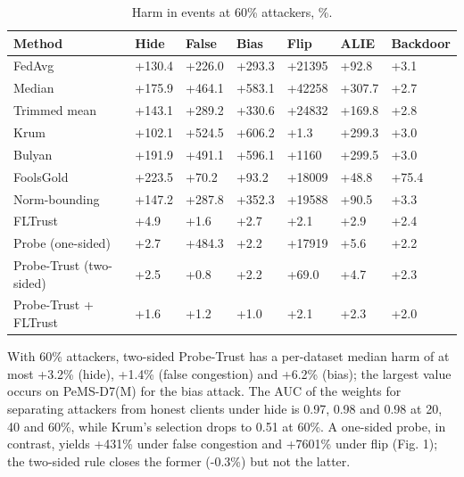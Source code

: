 \documentclass[journal]{IEEEtran}
\begin{document}
\begin{table}[!t]
\caption{Harm in events at 60\% attackers, \%.}
\centering
\footnotesize
\renewcommand{\arraystretch}{1.12}
\begin{tabular}{|>{\raggedright\arraybackslash}p{4.15cm}|>{\raggedright\arraybackslash}p{1.75cm}|>{\raggedright\arraybackslash}p{1.75cm}|>{\raggedright\arraybackslash}p{1.75cm}|>{\raggedright\arraybackslash}p{1.75cm}|>{\raggedright\arraybackslash}p{1.75cm}|>{\raggedright\arraybackslash}p{1.75cm}|}
\hline
\textbf{Method} & \textbf{Hide} & \textbf{False} & \textbf{Bias} & \textbf{Flip} & \textbf{ALIE} & \textbf{Backdoor} \\
\hline
FedAvg & +130.4 & +226.0 & +293.3 & +21395 & +92.8 & +3.1 \\
\hline
Median & +175.9 & +464.1 & +583.1 & +42258 & +307.7 & +2.7 \\
\hline
Trimmed mean & +143.1 & +289.2 & +330.6 & +24832 & +169.8 & +2.8 \\
\hline
Krum & +102.1 & +524.5 & +606.2 & +1.3 & +299.3 & +3.0 \\
\hline
Bulyan & +191.9 & +491.1 & +596.1 & +1160 & +299.5 & +3.0 \\
\hline
FoolsGold & +223.5 & +70.2 & +93.2 & +18009 & +48.8 & +75.4 \\
\hline
Norm-bounding & +147.2 & +287.8 & +352.3 & +19588 & +90.5 & +3.3 \\
\hline
FLTrust & +4.9 & +1.6 & +2.7 & +2.1 & +2.9 & +2.4 \\
\hline
Probe (one-sided) & +2.7 & +484.3 & +2.2 & +17919 & +5.6 & +2.2 \\
\hline
Probe-Trust (two-sided) & +2.5 & +0.8 & +2.2 & +69.0 & +4.7 & +2.3 \\
\hline
Probe-Trust + FLTrust & +1.6 & +1.2 & +1.0 & +2.1 & +2.3 & +2.0 \\
\hline
\end{tabular}
\end{table}
With 60\% attackers, two-sided Probe-Trust has a per-dataset median harm of at most +3.2\% (hide), +1.4\% (false congestion) and +6.2\% (bias); the largest value occurs on PeMS-D7(M) for the bias attack. The AUC of the weights for separating attackers from honest clients under hide is 0.97, 0.98 and 0.98 at 20, 40 and 60\%, while Krum's selection drops to 0.51 at 60\%. A one-sided probe, in contrast, yields +431\% under false congestion and +7601\% under flip (Fig. 1); the two-sided rule closes the former (-0.3\%) but not the latter.
\end{document}
